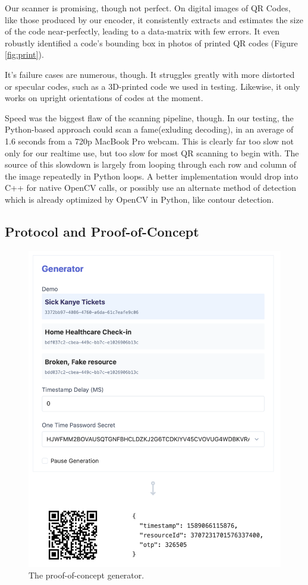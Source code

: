 \documentclass[10pt,twocolumn,letterpaper]{article}
\begin{document}
Our scanner is promising, though not perfect. On digital images of QR Codes, like those produced by our encoder, it consistently extracts and estimates the size of the code near-perfectly, leading to a data-matrix with few errors. It even robustly identified a code's bounding box in photos of printed QR codes (Figure \ref{fig:print}).

It's failure cases are numerous, though. It struggles greatly with more distorted or specular codes, such as a 3D-printed code we used in testing. Likewise, it only works on upright orientations of codes at the moment.

Speed was the biggest flaw of the scanning pipeline, though. In our testing, the Python-based approach could scan a fame(exluding decoding), in an average of 1.6 seconds from a 720p MacBook Pro webcam. This is clearly far too slow not only for our realtime use, but too slow for most QR scanning to begin with. The source of this slowdown is largely from looping through each row and column of the image repeatedly in Python loops. A better implementation would drop into C++ for native OpenCV calls, or possibly use an alternate method of detection which is already optimized by OpenCV in Python, like contour detection.

\subsection{Protocol and Proof-of-Concept}

\begin{figure}[t]
   \begin{center}
      \includegraphics[width=0.8\linewidth]{gen.png}
   \end{center}
      \caption{The proof-of-concept generator.}
   \label{fig:gen}
\end{figure}
\end{document}

